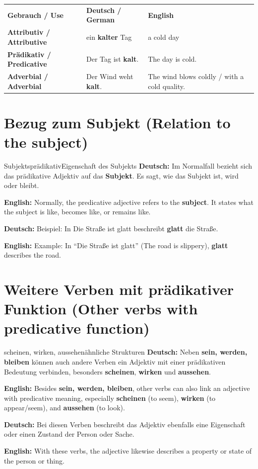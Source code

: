 \documentclass[a4paper,11pt]{article}
\newcommand{\GermanText}[1]{\textbf{Deutsch: }#1\par}
\newcommand{\EnglishText}[1]{{\small\color{SoftGray}\textbf{English: }#1\par}}
\begin{document}
        \begin{longtable}{>{\bfseries}p{3.5cm}|p{5.4cm}|p{5.4cm}}
            \rowcolor{HeaderBlueDark}
            \color{white}\textbf{Gebrauch / Use} &
            \color{white}\textbf{Deutsch / German} &
            \color{white}\textbf{English} \\
            Attributiv / Attributive & ein \textbf{kalter} Tag & a cold day \\
            Prädikativ / Predicative & Der Tag ist \textbf{kalt}. & The day is cold. \\
            Adverbial / Adverbial & Der Wind weht \textbf{kalt}. & The wind blows coldly / with a cold quality. \\
        \end{longtable}

    \section{Bezug zum Subjekt \textnormal{(Relation to the subject)}}

        \begin{grammarentry}{Subjektsprädikativ}{Eigenschaft des Subjekts}
            \GermanText{Im Normalfall bezieht sich das prädikative Adjektiv auf das \textbf{Subjekt}. Es sagt, wie das Subjekt ist, wird oder bleibt.}
            \EnglishText{Normally, the predicative adjective refers to the \textbf{subject}. It states what the subject is like, becomes like, or remains like.}

            \GermanText{Beispiel: In \glqq Die Straße ist glatt\grqq{} beschreibt \textbf{glatt} die Straße.}
            \EnglishText{Example: In ``Die Straße ist glatt'' (The road is slippery), \textbf{glatt} describes the road.}
        \end{grammarentry}

    \section{Weitere Verben mit prädikativer Funktion \textnormal{(Other verbs with predicative function)}}

        \begin{grammarentry}{scheinen, wirken, aussehen}{ähnliche Strukturen}
            \GermanText{Neben \textbf{sein, werden, bleiben} können auch andere Verben ein Adjektiv mit einer prädikativen Bedeutung verbinden, besonders \textbf{scheinen}, \textbf{wirken} und \textbf{aussehen}.}
            \EnglishText{Besides \textbf{sein, werden, bleiben}, other verbs can also link an adjective with predicative meaning, especially \textbf{scheinen} (to seem), \textbf{wirken} (to appear/seem), and \textbf{aussehen} (to look).}

            \GermanText{Bei diesen Verben beschreibt das Adjektiv ebenfalls eine Eigenschaft oder einen Zustand der Person oder Sache.}
            \EnglishText{With these verbs, the adjective likewise describes a property or state of the person or thing.}
        \end{grammarentry}
\end{document}
